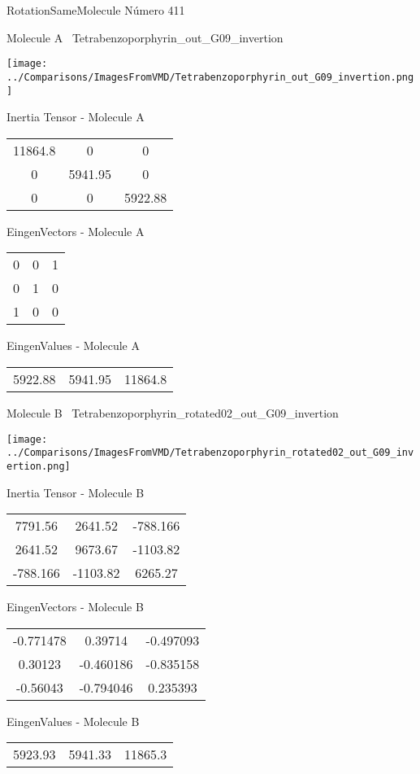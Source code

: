 \vtab[-3cm]
\begin{center}
{\large RotationSameMolecule \tab Número 411}
\end{center}
\begin{multicols}{2}
\begin{center}

Molecule A \
Tetrabenzoporphyrin\_out\_G09\_invertion

\texttt{[image: ../Comparisons/ImagesFromVMD/Tetrabenzoporphyrin\_out\_G09\_invertion.png]}

Inertia Tensor - Molecule A \\
\begin{tabular}{|c c c|}
11864.8	 & 	0	 & 	0	 \\
0	 & 	5941.95	 & 	0	 \\
0	 & 	0	 & 	5922.88
\end{tabular}

\vtab
 EingenVectors - Molecule A     \\
\begin{tabular}{|c c c|}
0	 & 	0	 & 	1	 \\
0	 & 	1	 & 	0	 \\
1	 & 	0	 & 	0
\end{tabular}

\vtab
 EingenValues - Molecule A     \\
\begin{tabular}{|c c c|}
5922.88	 & 	5941.95	 & 	11864.8	 \\
\end{tabular}
\columnbreak

Molecule B \
Tetrabenzoporphyrin\_rotated02\_out\_G09\_invertion

\texttt{[image: ../Comparisons/ImagesFromVMD/Tetrabenzoporphyrin\_rotated02\_out\_G09\_invertion.png]}

Inertia Tensor - Molecule B \\
\begin{tabular}{|c c c|}
7791.56	 & 	2641.52	 & 	-788.166	 \\
2641.52	 & 	9673.67	 & 	-1103.82	 \\
-788.166	 & 	-1103.82	 & 	6265.27
\end{tabular}

\vtab
 EingenVectors - Molecule B     \\
\begin{tabular}{|c c c|}
-0.771478	 & 	0.39714	 & 	-0.497093	 \\
0.30123	 & 	-0.460186	 & 	-0.835158	 \\
-0.56043	 & 	-0.794046	 & 	0.235393
\end{tabular}

\vtab
 EingenValues - Molecule B     \\
\begin{tabular}{|c c c|}
5923.93	 & 	5941.33	 & 	11865.3	 \\
\end{tabular}

\end{center}
\end{multicols}

